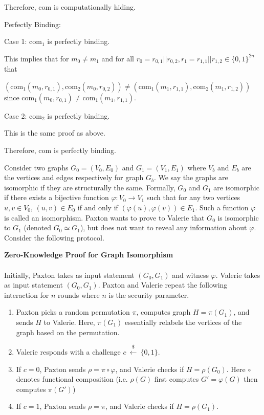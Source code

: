 \documentclass[12pt, letterpaper]{article}
\newcommand{\bit}{{\{0,1\}}}
\newcommand{\com}{\mathrm{com}}
\newcommand{\sample}{\overset{\$}{\leftarrow}}
\begin{document}
\begin{problemproof}
    Therefore, $\com$ is computationally hiding.

    Perfectly Binding:

    Case 1: $\com_1$ is perfectly binding.

    This implies that for $m_0 \neq m_1$ and for all $r_0=r_{0,1}||r_{0,2},r_1=r_{1,1}||r_{1,2} \in \bit^{2n}$ that 
    
    $(\com_1(m_0,r_{0,1}), \com_2(m_0,r_{0,2})) \neq (\com_1(m_1,r_{1,1}), \com_2(m_1,r_{1,2}))$ since $\com_1(m_0,r_{0,1}) \neq \com_1(m_1,r_{1,1})$.

    Case 2: $\com_2$ is perfectly binding.

    This is the same proof as above.

    Therefore, $\com$ is perfectly binding.
\end{problemproof}

\begin{problem}{}
    Consider two graphs $G_0 = (V_0,E_0) $ and $G_1= (V_1,E_1)$ where $V_b$ and $E_b$ are the vertices and edges respectively for graph $G_b$. We say the graphs are isomorphic if they are structurally the same. Formally, $G_0$ and $G_1$ are isomorphic if there exists a bijective function $\varphi: V_0 \to V_1$ such that for any two vertices $u,v \in V_0$, $(u,v) \in E_0$ if and only if $(\varphi(u),\varphi(v)) \in E_1$. Such a function $\varphi$ is called an isomorphism.
Paxton wants to prove to Valerie that $G_0$ is isomorphic to $G_1$ (denoted $G_0 \simeq G_1$),
but does not want to reveal any information about $\varphi$.
Consider the following protocol.
\vspace{1em}
\begin{mdframed}
    \vspace{0.5em}
    \textbf{Zero-Knowledge Proof for Graph Isomorphism}\\\\
    Initially, Paxton takes as input statement $(G_0, G_1)$ and witness $\varphi$. Valerie takes as input statement $(G_0, G_1)$.
    Paxton and Valerie repeat the following interaction for $n$ rounds where $n$ is the security parameter.
    \begin{enumerate}
        \item Paxton picks a random permutation $\pi$, computes graph $H = \pi(G_1)$, and sends $H$ to Valerie. Here, $\pi(G_1)$ essentially relabels the vertices of the graph based on the permutation.
        \item Valerie responds with a challenge $c\ \sample\ \{0, 1\}$.
        \item If $c = 0$, Paxton sends $\rho = \pi \circ \varphi$, and Valerie checks if $H = \rho(G_0)$. Here $\circ$ denotes functional composition (i.e. $\rho(G)$ first computes $G' = \varphi(G)$ then computes $\pi(G')$)
        \item If $c = 1$, Paxton sends $\rho = \pi$, and Valerie checks if $H = \rho(G_1)$.
    \end{enumerate}
\end{mdframed}
\vspace{1em}
\end{problem}
\end{document}
